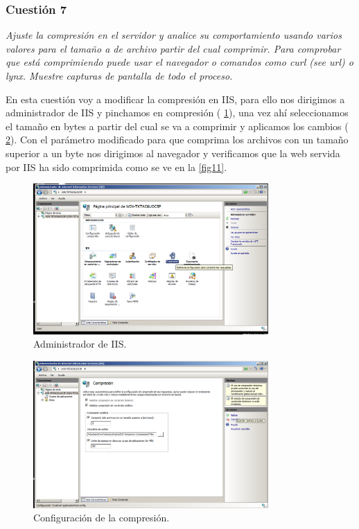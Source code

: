 \subsubsection{Cuestión 7}
\textit{Ajuste la compresión en el servidor y analice su
comportamiento usando varios valores para el tamaño a de archivo partir del cual comprimir. Para comprobar que está comprimiendo puede usar el navegador o comandos como curl (see url) o lynx. Muestre capturas de pantalla de todo el proceso.}
\newline

En esta cuestión voy a modificar la compresión en IIS, para ello nos dirigimos a administrador de IIS y pinchamos en compresión ( \cref{fig9}), una vez ahí seleccionamos el tamaño en bytes a partir del cual se va a comprimir y aplicamos los cambios ( \cref{fig10}). Con el parámetro modificado para que comprima los archivos con un tamaño superior a un byte nos dirigimos al navegador y verificamos que la web servida por IIS ha sido comprimida como se ve en la \cref{fig11}.


\begin{figure}[H]
  \begin{center}
    \includegraphics[width=0.8\textwidth]{imagenes/9}
    \caption{Administrador de IIS.}
    \label{fig9}
  \end{center}
\end{figure}

\begin{figure}[H]
  \begin{center}
    \includegraphics[width=0.8\textwidth]{imagenes/10}
    \caption{Configuración de la compresión.}
    \label{fig10}
  \end{center}
\end{figure}

